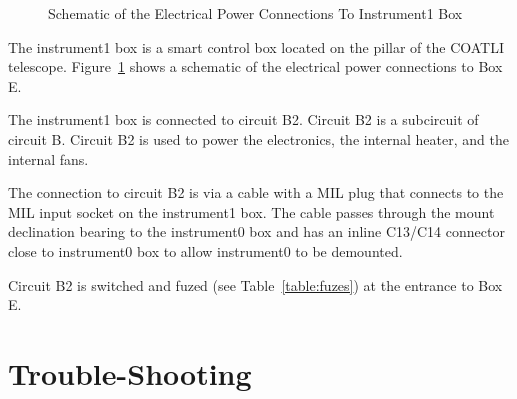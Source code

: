 \begin{figure}
\begin{center}
\footnotesize 
{}
\end{center}
\caption{Schematic of the Electrical Power Connections To Instrument1 Box}
\label{figure:schematic-electrical-power-instrument1-box}
\end{figure}

The instrument1 box is a smart control box located on the pillar of the COATLI telescope. Figure~\ref{figure:schematic-electrical-power-instrument1-box} shows a schematic of the electrical power connections to Box E.

The instrument1 box is connected to circuit B2. Circuit B2 is a subcircuit of circuit B. Circuit B2 is used to power the electronics, the internal heater, and the internal fans.

The connection to circuit B2 is via a cable with a MIL plug that connects to the MIL input socket on the instrument1 box. The cable passes through the mount declination bearing to the instrument0 box and has an inline C13/C14 connector close to instrument0 box to allow instrument0 to be demounted.

Circuit B2 is switched and fuzed (see Table~\ref{table:fuzes}) at the entrance to Box E.

\fi

\section{Trouble-Shooting}

